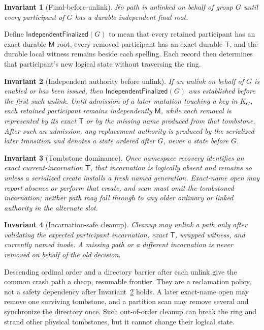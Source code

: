 \documentclass[10pt,twocolumn]{article}
\newtheorem{invariant}{Invariant}
\theoremstyle{remark}
\newcommand{\Materialized}{\mathsf{M}}
\newcommand{\Tombstone}{\mathsf{T}}
\begin{document}
\begin{invariant}[Final-before-unlink]\label{i:finalfirst}
No path is unlinked on behalf of group $G$ until every participant of $G$ has a durable independent
final root.
\end{invariant}

Define $\mathsf{IndependentFinalized}(G)$ to mean that every retained participant has an exact
durable $\Materialized$ root, every removed participant has an exact durable $\Tombstone$, and the
durable local witness remains beside each spelling. Each record then determines that participant's
new logical state without traversing the ring.

\begin{invariant}[Independent authority before unlink]\label{i:independent}
If an unlink on behalf of $G$ is enabled or has been issued, then
$\mathsf{IndependentFinalized}(G)$ was established before the first such unlink. Until admission
of a later mutation touching a key in $K_G$, each retained participant remains independently
$\Materialized$, while each removal is represented by its exact $\Tombstone$ or by the missing name
produced from that tombstone. After such an admission, any replacement authority is produced by the
serialized later transition and denotes a state ordered after $G$, never a state before $G$.
\end{invariant}

\begin{invariant}[Tombstone dominance]\label{i:tdominance}
Once namespace recovery identifies an exact current-incarnation $\Tombstone$, that incarnation is
logically absent and remains so unless a serialized create installs a fresh named generation.
Exact-name open may report absence or perform that create, and scan must omit the tombstoned
incarnation; neither path may fall through to any older ordinary or linked authority in the
alternate slot.
\end{invariant}

\begin{invariant}[Incarnation-safe cleanup]\label{i:cleanup}
Cleanup may unlink a path only after validating the expected participant incarnation, exact
$\Tombstone$, wrapped witness, and currently named inode. A missing path or a different
incarnation is never removed on behalf of the old decision.
\end{invariant}

Descending ordinal order and a directory barrier after each unlink give the common crash path a
cheap, resumable frontier. They are a reclamation policy, not a safety dependency after
Invariant~\ref{i:independent} holds. A later exact-name open may remove one surviving tombstone, and
a partition scan may remove several and synchronize the directory once. Such out-of-order cleanup
can break the ring and strand other physical tombstones, but it cannot change their logical state.
\end{document}
